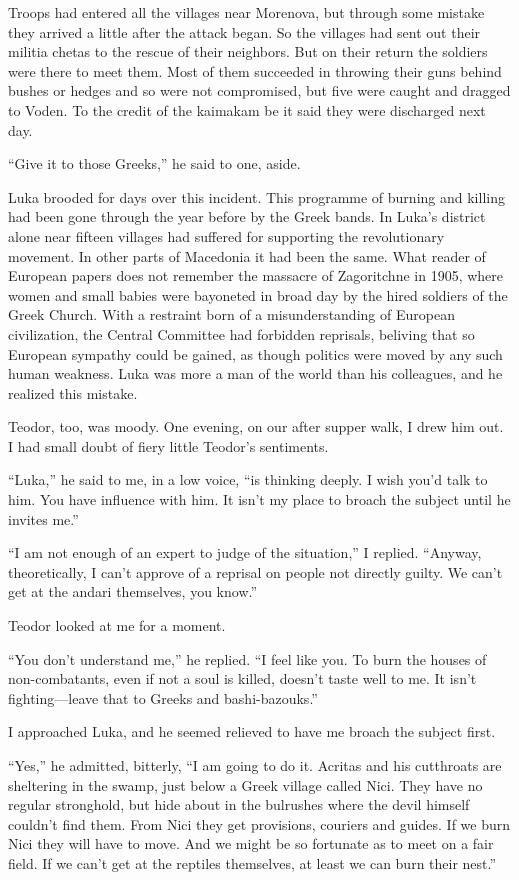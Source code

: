 \documentclass[a5paper,12pt]{book}
\begin{document}
Troops had entered all the villages near Morenova, but through some mistake they arrived a little after the attack began. So the villages had sent out their militia chetas to the rescue of their neighbors. But on their return the soldiers were there to meet them. Most of them succeeded in throwing their guns behind bushes or hedges and so were not compromised, but five were caught and dragged to Voden. To the credit of the kaimakam be it said they were discharged next day. 

“Give it to those Greeks,” he said to one, aside. 

Luka brooded for days over this incident. This programme of burning and killing had been gone through the year before by the Greek bands. In Luka’s district alone near fifteen villages had suffered for supporting the revolutionary movement. In other parts of Macedonia it had been the same. What reader of European papers does not remember the massacre of Zagoritchne in 1905, where women and small babies were bayoneted in broad day by the hired soldiers of the Greek Church. With a restraint born of a misunderstanding of European civilization, the Central Committee had forbidden reprisals, beliving that so European sympathy could be gained, as though politics were moved by any such human weakness. Luka was more a man of the world than his colleagues, and he realized this mistake. 

Teodor, too, was moody. One evening, on our after supper walk, I drew him out. I had small doubt of fiery little Teodor's sentiments. 

“Luka,” he said to me, in a low voice, “is thinking deeply. I wish you'd talk to him. You have influence with him. It isn’t my place to broach the subject until he invites me.” 

“I am not enough of an expert to judge of the situation,” I replied. “Anyway, theoretically, I can’t approve of a reprisal on people not directly guilty. We can’t get at the andari themselves, you know.” 

Teodor looked at me for a moment. 

“You don’t understand me,” he replied. “I feel like you. To burn the houses of non-combatants, even if not a soul is killed, doesn’t taste well to me. It isn’t fighting—leave that to Greeks and bashi-bazouks.” 

I approached Luka, and he seemed relieved to have me broach the subject first. 

“Yes,” he admitted, bitterly, “I am going to do it.
Acritas and his cutthroats are sheltering in the swamp, just below a Greek village called Nici. They have no regular stronghold, but hide about in the bulrushes where the devil himself couldn’t find them. From Nici they get provisions, couriers and guides. If we burn Nici they will have to move. And we might be so fortunate as to meet on a fair field. If we can’t get at the reptiles themselves, at least we can burn their nest.”
\end{document}
